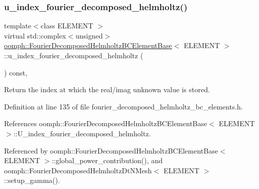 \subsubsection{\texorpdfstring{u\+\_\+index\+\_\+fourier\+\_\+decomposed\+\_\+helmholtz()}{u\_index\_fourier\_decomposed\_helmholtz()}}
{\footnotesize\ttfamily template$<$class E\+L\+E\+M\+E\+NT $>$ \\
virtual std\+::complex$<$unsigned$>$ \hyperlink{classoomph_1_1FourierDecomposedHelmholtzBCElementBase}{oomph\+::\+Fourier\+Decomposed\+Helmholtz\+B\+C\+Element\+Base}$<$ E\+L\+E\+M\+E\+NT $>$\+::u\+\_\+index\+\_\+fourier\+\_\+decomposed\+\_\+helmholtz (\begin{DoxyParamCaption}{ }\end{DoxyParamCaption}) const\hspace{0.3cm}{\ttfamily [inline]}, {\ttfamily [virtual]}}



Return the index at which the real/imag unknown value is stored. 



Definition at line 135 of file fourier\+\_\+decomposed\+\_\+helmholtz\+\_\+bc\+\_\+elements.\+h.



References oomph\+::\+Fourier\+Decomposed\+Helmholtz\+B\+C\+Element\+Base$<$ E\+L\+E\+M\+E\+N\+T $>$\+::\+U\+\_\+index\+\_\+fourier\+\_\+decomposed\+\_\+helmholtz.



Referenced by oomph\+::\+Fourier\+Decomposed\+Helmholtz\+B\+C\+Element\+Base$<$ E\+L\+E\+M\+E\+N\+T $>$\+::global\+\_\+power\+\_\+contribution(), and oomph\+::\+Fourier\+Decomposed\+Helmholtz\+Dt\+N\+Mesh$<$ E\+L\+E\+M\+E\+N\+T $>$\+::setup\+\_\+gamma().

\mbox{\label{classoomph_1_1FourierDecomposedHelmholtzBCElementBase_a6bbf014e96f180c90265e96fd00a0358}} 
